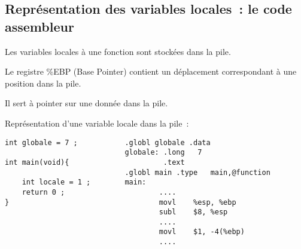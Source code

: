 \begin{frame}
  \section{Repr\'esentation des variables locales~: le code assembleur}%
  Les variables locales \`a une fonction sont stock\'ees dans la pile.
  \par\smallskip
  Le registre \%EBP (Base Pointer) contient un d\'eplacement
  correspondant \`a une position dans la pile.
  \par\smallskip
  Il sert \`a pointer sur une donn\'ee dans la pile. 

        Repr\'esentation d'une variable locale dans la pile~:
\begin{verbatim}
int globale = 7 ;           .globl globale .data                 
                            globale: .long   7                   
int main(void){                      .text                        
                            .globl main .type   main,@function   
    int locale = 1 ;        main:                                
    return 0 ;                      ....                         
}                                   movl    %esp, %ebp           
                                    subl    $8, %esp  
                                    .... 
                                    movl    $1, -4(%ebp)         
                                    ....                         
\end{verbatim}
\end{frame}
